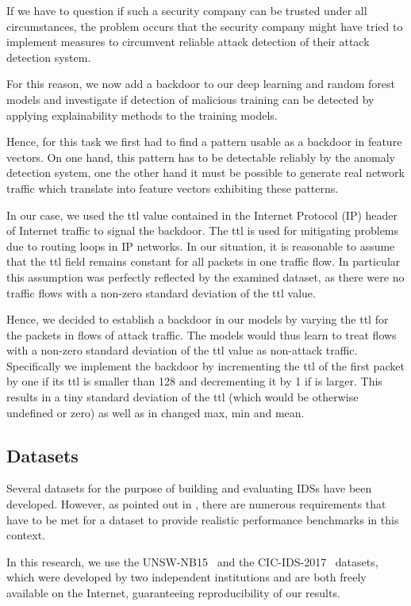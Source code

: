 \documentclass[10pt,sigconf,letterpaper,dvipsnames]{acmart}
\begin{document}
If we have to question if such a security company can be trusted under all circumstances, the problem occurs that the security company might have tried to implement measures to circumvent reliable attack detection of their attack detection system.

For this reason, we now add a backdoor to our deep learning and random forest models and investigate if detection of malicious training can be detected by applying explainability methods to the training models.

Hence, for this task we first had to find a pattern usable as a backdoor in feature vectors. On one hand, this pattern has to be detectable reliably by the anomaly detection system, one the other hand it must be possible to generate real network traffic which translate into feature vectors exhibiting these patterns.

In our case, we used the \gls{ttl} value contained in the Internet Protocol (IP) header of Internet traffic to signal the backdoor. The \gls{ttl} is used for mitigating problems due to routing loops in IP networks. In our situation, it is reasonable to assume that the \gls{ttl} field remains constant for all packets in one traffic flow. In particular this assumption was perfectly reflected by the examined dataset, as there were no traffic flows with a non-zero standard deviation of the \gls{ttl} value.

Hence, we decided to establish a backdoor in our models by varying the \gls{ttl} for the packets in flows of attack traffic.  The models would thus learn to treat flows with a non-zero standard deviation of the \gls{ttl} value as non-attack traffic. Specifically we implement the backdoor by incrementing the \gls{ttl} of the first packet by one if its \gls{ttl} is smaller than 128 and decrementing it by 1 if is larger. This results in a tiny standard deviation of the \gls{ttl} (which would be otherwise undefined or zero) as well as in changed max, min and mean.
\subsection{Datasets}
Several datasets for the purpose of building and evaluating IDSs have been developed. However, as pointed out in \cite{gharib2016}, there are numerous requirements that have to be met for a dataset to provide realistic performance benchmarks in this context.

In this research, we use the UNSW-NB15~\cite{moustafa2015unsw} and the CIC-IDS-2017~\cite{Sharafaldin2018} datasets, which were developed by two independent institutions and are both freely available on the Internet, guaranteeing reproducibility of our results.
\end{document}
